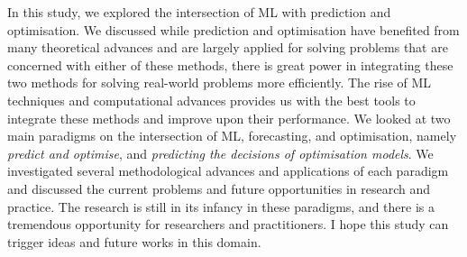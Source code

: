 \documentclass[graybox]{svmult}
\begin{document}
In this study, we explored the intersection of ML with prediction and optimisation. We discussed while prediction and optimisation have benefited from many theoretical advances and are largely applied for solving problems that are concerned with either of these methods, there is great power in integrating these two methods for solving real-world problems more efficiently. The rise of ML techniques and computational advances provides us with the best tools to integrate these methods and improve upon their performance.  We looked at two main paradigms on the intersection of ML, forecasting, and optimisation, namely \textit{predict and optimise}, and \textit{predicting the decisions of optimisation models}. We investigated several methodological advances and applications of each paradigm and discussed the current problems and future opportunities in research and practice. The research is still in its infancy in these paradigms, and there is a tremendous opportunity for researchers and practitioners. I hope this study can trigger ideas and future works in this domain.

%

\printbibliography
\end{document}
